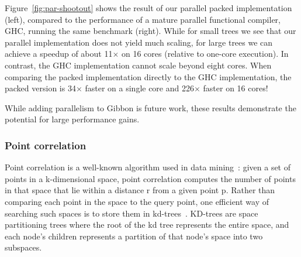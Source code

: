 \documentclass[a4paper,english]{lipics-v2016}
\newcommand{\treelang}{Gibbon\xspace} %
\begin{document}


Figure~\ref{fig:par-shootout} shows the result of our parallel packed
implementation (left), compared to the performance of a mature parallel
functional compiler, GHC, running the same benchmark (right). While for small
trees we see that our parallel implementation does not yield much scaling, for
large trees we can achieve a speedup of about 11$\times$ on 16 cores (relative
to one-core execution). In contrast, the GHC implementation cannot scale
beyond eight cores. When comparing the packed implementation directly to the
GHC implementation, the packed version is 34$\times$ faster on a single core
and 226$\times$ faster on 16 cores!

While adding parallelism to \treelang{} is future work, these results
demonstrate the potential for large performance gains.

% 


\subsubsection{Point correlation} \label{sec:eval-kdtree}
Point correlation  is a well-known algorithm used in data mining~\cite{gray2000n}:
given a set of points in a k-dimensional space, point correlation computes the number of points in that space  that lie within a
distance r from a given point p. Rather than comparing each point in the space to the query point, one efficient way of searching such spaces is to store them in kd-trees~\cite{bentley75}. KD-trees are space partitioning trees where the root of the kd tree represents the entire space, and each node's children represents a partition of that node's space into two subspaces.

\end{document}
